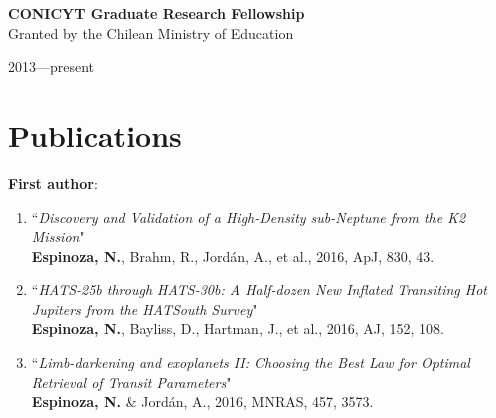 \documentclass[11pt, a4paper]{article} %
\begin{document}
\begin{minipage}[t]{0.7\textwidth}
\begin{flushleft}%
  \setlength{\leftskip}{0.2cm}%
\textbf{CONICYT Graduate Research Fellowship}\\
Granted by the Chilean Ministry of Education
\end{flushleft}
\end{minipage}
\begin{minipage}[t]{0.3\textwidth}
\hfill 2013---present
\end{minipage}

\section*{Publications}
\begin{flushleft}%
  \setlength{\leftskip}{0.2cm}%
\textbf{First author}:
\begin{enumerate}
\setlength\itemsep{0.05cm}
\item ``\textit{Discovery and Validation of a High-Density sub-Neptune from the K2 Mission}"\\
          \textbf{Espinoza, N.}, Brahm, R., Jord\'an, A., et al., 2016, ApJ, 830, 43.

\item ``\textit{HATS-25b through HATS-30b: A Half-dozen New Inflated Transiting Hot Jupiters from the HATSouth Survey}"\\
          \textbf{Espinoza, N.}, Bayliss, D., Hartman, J., et al., 2016, AJ, 152, 108.

\item ``\textit{Limb-darkening and exoplanets II: Choosing the Best Law for Optimal Retrieval of Transit Parameters}"\\
          \textbf{Espinoza, N.} \& Jord\'an, A., 2016, MNRAS, 457, 3573.
          

\end{enumerate}
\end{flushleft}
\end{document}
